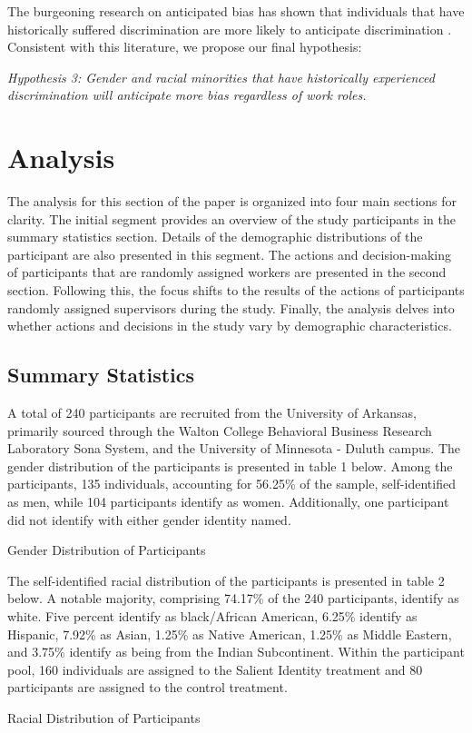 The burgeoning research on anticipated bias has shown that individuals that have historically suffered discrimination are more likely to anticipate discrimination \citep{charness2020,aksoy2023}. Consistent with this literature, we propose our final hypothesis: 

    \textit{Hypothesis 3: Gender and racial minorities that have historically experienced discrimination will anticipate more bias regardless of work roles.}

\section{Analysis} \label{sec:Analysis}
The analysis for this section of the paper is organized into four main sections for clarity. The initial segment provides an overview of the study participants in the summary statistics section. Details of the demographic distributions of the participant are also presented in this segment. The actions and decision-making of participants that are randomly assigned workers are presented in the second section. Following this, the focus shifts to the results of the actions of participants randomly assigned supervisors during the study. Finally, the analysis delves into whether actions and decisions in the study vary by demographic characteristics.

\subsection{Summary Statistics}
A total of 240 participants are recruited from the University of Arkansas, primarily sourced through the Walton College Behavioral Business Research Laboratory Sona System, and the University of Minnesota - Duluth campus. The gender distribution of the participants is presented in table 1 below. Among the participants, 135 individuals, accounting for 56.25\% of the sample, self-identified as men, while 104 participants identify as women. Additionally, one participant did not identify with either gender identity named.

\begin{table}[H]
 \captionsetup{justification=raggedright,singlelinecheck=false}
\caption{Gender Distribution of Participants } \label{tab:table1}
        
\end{table}

The self-identified racial distribution of the participants is presented in table 2 below. A notable majority, comprising 74.17\% of the 240 participants, identify as white. Five percent identify as black/African American, 6.25\% identify as Hispanic, 7.92\% as Asian, 1.25\% as Native American, 1.25\% as Middle Eastern, and 3.75\% identify as being from the Indian Subcontinent. Within the participant pool, 160 individuals are assigned to the Salient Identity treatment and 80 participants are assigned to the control treatment.
\begin{table}[H]
 \captionsetup{justification=raggedright,singlelinecheck=false}
\caption{Racial Distribution of Participants} \label{tab:table2}
        
\end{table}

